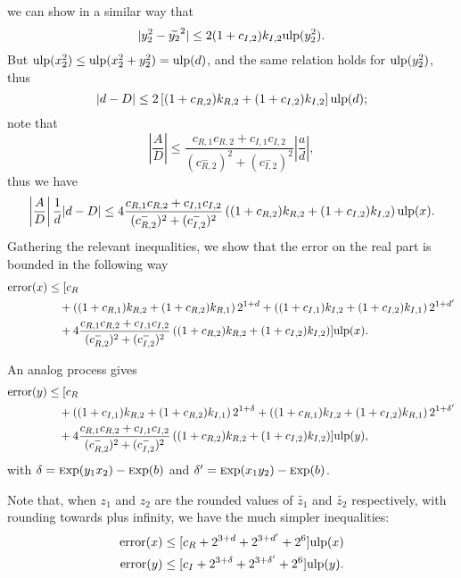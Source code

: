 \documentclass {article}
\DeclareMathOperator{\error}{error}
\newcommand {\Ulp}{{\rm ulp}}
\newcommand {\Exp}{{\rm \textsc exp}}
\begin{document}
we can show in a similar way that
\[
|y_2^2-\widetilde{y_2}^2| \leq 2(1+c_{I,2})k_{I,2}\Ulp(y_2^2).
\]
But $\Ulp(x_2^2) \leq \Ulp(x_2^2+y_2^2) = \Ulp(d)$, and the same relation
holds for $\Ulp(y_2^2)$, thus
\[
|d-D| \leq 2\left[(1+c_{R,2})k_{R,2}+(1+c_{I,2})k_{I,2}\right]\Ulp(d);
\]
note that
\[
\left|\frac{A}{D}\right| \leq
\frac{c_{R,1}c_{R,2}+c_{I,1}c_{I,2}}{(c_{R,2}^-)^2+(c_{I,2}^-)^2}
\left|\frac{a}{d}\right|,
\]
thus we have
\[
\left|\frac{A}{D}\right|\frac{1}{d}|d-D| \leq
4\frac{c_{R,1}c_{R,2}+c_{I,1}c_{I,2}}{(c_{R,2}^-)^2+(c_{I,2}^-)^2}
\left((1+c_{R,2})k_{R,2}+(1+c_{I,2})k_{I,2}\right)\Ulp(x).
\]
Gathering the relevant inequalities, we show that the error on the real part
is bounded in the following way
\begin{equation*}
  \begin{split}
    \error(x) &\leq [c_R\\
    &\quad+\left((1+c_{R,1})k_{R,2}+(1+c_{R,2})k_{R,1}\right)2^{1+d}
    +\left((1+c_{I,1})k_{I,2}+(1+c_{I,2})k_{I,1}\right)2^{1+d'}\\
    &\quad+4\frac{c_{R,1}c_{R,2}+c_{I,1}c_{I,2}}{(c_{R,2}^-)^2+(c_{I,2}^-)^2}
    \left((1+c_{R,2})k_{R,2}+(1+c_{I,2})k_{I,2}\right)]
    \Ulp(x).
  \end{split}
\end{equation*}

An analog process gives
\begin{equation*}
  \begin{split}
    \error(y) &\leq [c_R\\
    &\quad+\left((1+c_{I,1})k_{R,2}+(1+c_{R,2})k_{I,1}\right)2^{1+\delta}
    +\left((1+c_{R,1})k_{I,2}+(1+c_{I,2})k_{R,1}\right)2^{1+\delta'}\\
    &\quad+4\frac{c_{R,1}c_{R,2}+c_{I,1}c_{I,2}}{(c_{R,2}^-)^2+(c_{I,2}^-)^2}
    \left((1+c_{R,2})k_{R,2}+(1+c_{I,2})k_{I,2}\right)]
    \Ulp(y),
  \end{split}
\end{equation*}
with $\delta=\Exp(y_1x_2)-\Exp(b)$ and $\delta'=\Exp(x_1y_2)-\Exp(b)$.

Note that, when $z_1$ and $z_2$ are the rounded values of $\widetilde{z_1}$
and $\widetilde{z_2}$ respectively, with rounding towards plus infinity, we
have the much simpler inequalities:
\begin{align*}
\error(x) &\leq [c_R + 2^{3+d} + 2^{3+d'} + 2^6] \Ulp(x)\\
\error(y) &\leq [c_I + 2^{3+\delta} + 2^{3+\delta'} + 2^6] \Ulp(y).
\end{align*}
\end{document}
